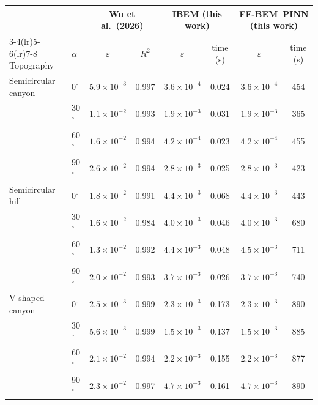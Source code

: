 \begin{tabular}{llcccccc}
\toprule
 & & \multicolumn{2}{c}{Wu et al.\ (2026)} & \multicolumn{2}{c}{IBEM (this work)} & \multicolumn{2}{c}{FF-BEM--PINN (this work)}\\
\cmidrule(lr){3-4}\cmidrule(lr){5-6}\cmidrule(lr){7-8}
Topography & $\alpha$ & $\varepsilon$ & $R^2$ & $\varepsilon$ & time (s) & $\varepsilon$ & time (s)\\
\midrule
Semicircular canyon & 0$^\circ$ & $5.9\times10^{-3}$ & 0.997 & $3.6\times10^{-4}$ & 0.024 & $3.6\times10^{-4}$ & 454\\
 & 30$^\circ$ & $1.1\times10^{-2}$ & 0.993 & $1.9\times10^{-3}$ & 0.031 & $1.9\times10^{-3}$ & 365\\
 & 60$^\circ$ & $1.6\times10^{-2}$ & 0.994 & $4.2\times10^{-4}$ & 0.023 & $4.2\times10^{-4}$ & 455\\
 & 90$^\circ$ & $2.6\times10^{-2}$ & 0.994 & $2.8\times10^{-3}$ & 0.025 & $2.8\times10^{-3}$ & 423\\
\addlinespace
Semicircular hill & 0$^\circ$ & $1.8\times10^{-2}$ & 0.991 & $4.4\times10^{-3}$ & 0.068 & $4.4\times10^{-3}$ & 443\\
 & 30$^\circ$ & $1.6\times10^{-2}$ & 0.984 & $4.0\times10^{-3}$ & 0.046 & $4.0\times10^{-3}$ & 680\\
 & 60$^\circ$ & $1.3\times10^{-2}$ & 0.992 & $4.4\times10^{-3}$ & 0.048 & $4.5\times10^{-3}$ & 711\\
 & 90$^\circ$ & $2.0\times10^{-2}$ & 0.993 & $3.7\times10^{-3}$ & 0.026 & $3.7\times10^{-3}$ & 740\\
\addlinespace
V-shaped canyon & 0$^\circ$ & $2.5\times10^{-3}$ & 0.999 & $2.3\times10^{-3}$ & 0.173 & $2.3\times10^{-3}$ & 890\\
 & 30$^\circ$ & $5.6\times10^{-3}$ & 0.999 & $1.5\times10^{-3}$ & 0.137 & $1.5\times10^{-3}$ & 885\\
 & 60$^\circ$ & $2.1\times10^{-2}$ & 0.994 & $2.2\times10^{-3}$ & 0.155 & $2.2\times10^{-3}$ & 877\\
 & 90$^\circ$ & $2.3\times10^{-2}$ & 0.997 & $4.7\times10^{-3}$ & 0.161 & $4.7\times10^{-3}$ & 890\\
\bottomrule
\end{tabular}
